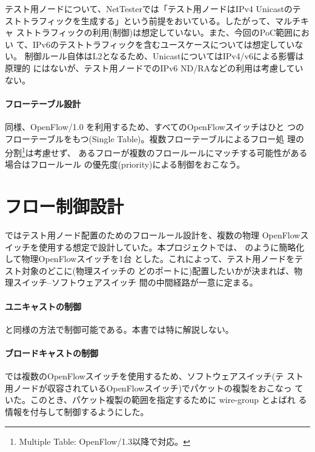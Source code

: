 テスト用ノードについて、NetTesterでは「テスト用ノードはIPv4 Unicastのテ
ストトラフィックを生成する」という前提をおいている。したがって、マルチキャ
ストトラフィックの利用(制御)は想定していない。また、今回のPoC範囲におい
て、IPv6のテストトラフィックを含むユースケースについては想定していない。
制御ルール自体はL2となるため、UnicastについてはIPv4/v6による影響は原理的
にはないが、テスト用ノードでのIPv6 ND/RAなどの利用は考慮していない。

    \paragraph{フローテーブル設計}

\lopj 同様、OpenFlow/1.0 を利用するため、すべてのOpenFlowスイッチはひと
つのフローテーブルをもつ(Single Table)。複数フローテーブルによるフロー処
理の分割\footnote{Multiple Table: OpenFlow/1.3以降で対応。}は考慮せず、
あるフローが複数のフロールールにマッチする可能性がある場合はフロールール
の優先度(priority)による制御をおこなう。

 \section{フロー制御設計}
 \label{sec:flow-design}

\lopj ではテスト用ノード配置のためのフロールール設計を、複数の物理
OpenFlowスイッチを使用する想定で設計していた。本プロジェクトでは、
のように簡略化して物理OpenFlowスイッチを1台
とした。これによって、テスト用ノードをテスト対象のどこに(物理スイッチの
どのポートに)配置したいかが決まれば、物理スイッチ--ソフトウェアスイッチ
間の中間経路が一意に定まる。

    \paragraph{ユニキャストの制御}

\lopj と同様の方法で制御可能である。本書では特に解説しない。

    \paragraph{ブロードキャストの制御}

\lopj では複数のOpenFlowスイッチを使用するため、ソフトウェアスイッチ(テ
スト用ノードが収容されているOpenFlowスイッチ)でパケットの複製をおこなっ
ていた。このとき、パケット複製の範囲を指定するために wire-group とよばれ
る情報を付与して制御するようにした。

